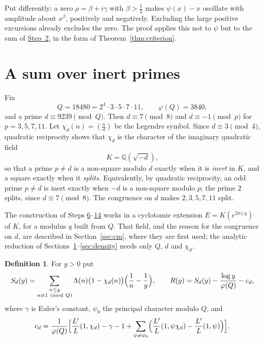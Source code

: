 \documentclass[11pt]{amsart}
\numberwithin{equation}{section}
\theoremstyle{definition}
\newtheorem{definition}[theorem]{Definition}
\theoremstyle{remark}
\newcommand{\Q}{\mathbb Q}
\begin{document}
Put differently: a zero $\rho=\beta+i\gamma$ with $\beta>\frac12$ makes $\psi(x)-x$ oscillate with amplitude about $x^\beta$, positively and negatively. Excluding the large positive excursions already excludes the zero. The proof applies this not to $\psi$ but to the sum of \hyperref[step:2]{Step~2}, in the form of Theorem~\ref{thm:criterion}.

\section{A sum over inert primes}\label{sec:sum}

Fix
\begin{equation}
 Q=18480=2^4\cdot3\cdot5\cdot7\cdot11,\qquad\varphi(Q)=3840,
\end{equation}
and a prime $d\equiv9239\pmod Q$. Then $d\equiv7\pmod 8$ and $d\equiv-1\pmod p$ for $p=3,5,7,11$. Let $\chi_d(n)=(\frac nd)$ be the Legendre symbol. Since $d\equiv3\pmod4$, quadratic reciprocity shows that $\chi_d$ is the character of the imaginary quadratic field
\begin{equation}
 K=\Q(\sqrt{-d}),
\end{equation}
so that a prime $p\ne d$ is a non-square modulo $d$ exactly when it is \emph{inert} in $K$, and a square exactly when it \emph{splits}. Equivalently, by quadratic reciprocity, an odd prime $p\ne d$ is inert exactly when $-d$ is a non-square modulo $p$; the prime $2$ splits, since $d\equiv7\pmod8$. The congruence on $d$ makes $2,3,5,7,11$ split.

The construction of Steps \hyperref[step:6]{6}--\hyperref[step:14]{14} works in a cyclotomic extension $E=K(e^{2\pi i/q})$ of $K$, for a modulus $q$ built from $Q$. That field, and the reason for the congruence on $d$, are described in Section~\ref{sec:cm}, where they are first used; the analytic reduction of Sections~\ref{sec:sum}--\ref{sec:density} needs only $Q$, $d$ and $\chi_d$.

\begin{definition}
For $y>0$ put
\begin{equation}\label{eq:Sdef}
 S_d(y)=\sum_{\substack{n\le y\\ n\equiv1\ (\mathrm{mod}\ Q)}}\Lambda(n)\bigl(1-\chi_d(n)\bigr)\Bigl(\frac1n-\frac1y\Bigr),
 \qquad
 R(y)=S_d(y)-\frac{\log y}{\varphi(Q)}-c_d,
\end{equation}
where $\gamma$ is Euler's constant, $\psi_0$ the principal character modulo $Q$, and
\begin{equation}\label{eq:cd}
 c_d=\frac1{\varphi(Q)}\Bigl[\frac{L'}{L}(1,\chi_d)-\gamma-1+\sum_{\psi\ne\psi_0}\Bigl(\frac{L'}{L}(1,\psi\chi_d)-\frac{L'}{L}(1,\psi)\Bigr)\Bigr].
\end{equation}
\end{definition}
\end{document}
